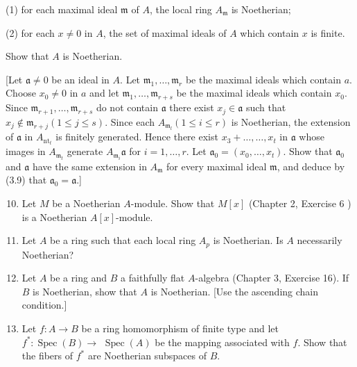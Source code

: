 \documentclass{standalone}
\theoremstyle{definition}
\theoremstyle{remark}
\begin{document}
(1) for each maximal ideal $\mathfrak{m}$ of $A$, the local ring $A_{\mathfrak{m}}$ is Noetherian;

(2) for each $x \neq 0$ in $A$, the set of maximal ideals of $A$ which contain $x$ is finite.

Show that $A$ is Noetherian.

[Let $\mathfrak{a} \neq 0$ be an ideal in $A$. Let $\mathfrak{m}_{1}, \ldots, \mathfrak{m}_{r}$ be the maximal ideals which contain $a$. Choose $x_{0} \neq 0$ in $a$ and let $\mathfrak{m}_{1}, \ldots, \mathfrak{m}_{r+s}$ be the maximal ideals which contain $x_{0}$. Since $\mathfrak{m}_{r+1}, \ldots, \mathfrak{m}_{r+s}$ do not contain $\mathfrak{a}$ there exist $x_{j} \in \mathfrak{a}$ such that $x_{j} \notin \mathfrak{m}_{r+j}(1 \leqslant j \leqslant s)$. Since each $A_{\mathfrak{m}_{l}}(1 \leqslant i \leqslant r)$ is Noetherian, the extension of $\mathfrak{a}$ in $A_{\mathrm{nt}_{t}}$ is finitely generated. Hence there exist $x_{3}+\ldots, \ldots, x_{t}$ in $\mathfrak{a}$ whose images in $A_{\mathfrak{m}_{t}}$ generate $A_{\mathfrak{m}_{i}} \mathfrak{a}$ for $i=1, \ldots, r$. Let $\mathfrak{a}_{0}=\left(x_{0}, \ldots, x_{t}\right)$. Show that $\mathfrak{a}_{0}$ and $\mathfrak{a}$ have the same extension in $A_{\mathfrak{m}}$ for every maximal ideal $\mathfrak{m}$, and deduce by (3.9) that $\mathfrak{a}_{0}=\mathfrak{a}$.]

\begin{enumerate}
  \setcounter{enumi}{9}
  \item Let $M$ be a Noetherian $A$-module. Show that $M[x]$ (Chapter 2, Exercise 6 ) is a Noetherian $A[x]$-module.

  \item Let $A$ be a ring such that each local ring $A_{p}$ is Noetherian. Is $A$ necessarily Noetherian?

  \item Let $A$ be a ring and $B$ a faithfully flat $A$-algebra (Chapter 3, Exercise 16). If $B$ is Noetherian, show that $A$ is Noetherian. [Use the ascending chain condition.]

  \item Let $f: A \rightarrow B$ be a ring homomorphism of finite type and let $f^{*}: \operatorname{Spec}(B) \rightarrow$ $\operatorname{Spec}(A)$ be the mapping associated with $f$. Show that the fibers of $f^{*}$ are Noetherian subspaces of $B$.

\end{enumerate}
\end{document}
